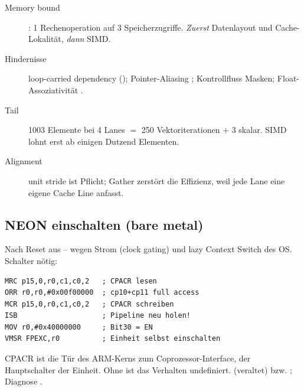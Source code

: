 \begin{description}
\item[Memory bound] : 1 Rechenoperation auf 3
  Speicherzugriffe. \emph{Zuerst} Datenlayout und Cache-Lokalität,
  \emph{dann} SIMD.
\item[Hindernisse] loop-carried dependency ();
  Pointer-Aliasing \ra {}; Kontrollfluss \ra Masken;
  Float-Assoziativität \ra {}.
\item[Tail] 1003 Elemente bei 4 Lanes $=$ 250 Vektoriterationen $+$ 3
  skalar. SIMD lohnt erst ab einigen Dutzend Elementen.
\item[Alignment] unit stride ist Pflicht; Gather zerstört die Effizienz,
  weil jede Lane eine eigene Cache Line anfasst.
\end{description}

\subsection{NEON einschalten (bare metal)}
Nach Reset aus -- wegen Strom (clock gating) und lazy Context Switch des OS.
 Schalter nötig:
\begin{lstlisting}
MRC p15,0,r0,c1,c0,2   ; CPACR lesen
ORR r0,r0,#0x00f00000  ; cp10+cp11 full access
MCR p15,0,r0,c1,c0,2   ; CPACR schreiben
ISB                    ; Pipeline neu holen!
MOV r0,#0x40000000     ; Bit30 = EN
VMSR FPEXC,r0          ; Einheit selbst einschalten
\end{lstlisting}
CPACR ist die Tür des ARM-Kerns zum Coprozessor-Interface,
 der Hauptschalter der Einheit. Ohne  ist das
Verhalten undefiniert.
  (veraltet) bzw.
; Diagnose .

